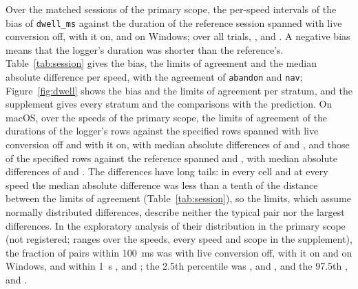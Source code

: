 Over the matched sessions of the primary scope, the per-speed intervals of the bias of \texttt{dwell\_ms} against the
duration of the reference session spanned  with live conversion
off,  with it on, and 
on Windows; over all trials, ,
 and . A negative bias means
that the logger's duration was shorter than the reference's. Table~\ref{tab:session} gives the bias, the limits of
agreement and the median absolute difference per speed, with the agreement of \texttt{abandon} and \texttt{nav};
Figure~\ref{fig:dwell} shows the bias and the limits of agreement per stratum, and the supplement gives every stratum
and the comparisons with the prediction. On macOS, over the speeds of the primary scope, the limits of agreement of the
durations of the logger's rows against the specified rows spanned
 with live conversion off and
 with it on, with median absolute differences of
 and
, and those of the specified rows against the reference
spanned  and
, with median absolute differences of
 and
. The differences have long tails: in every cell and at every
speed the median absolute difference was less than a tenth of the distance between the limits of agreement
(Table~\ref{tab:session}), so the limits, which assume normally distributed differences, describe neither the typical
pair nor the largest differences. In the exploratory analysis of their distribution in the primary scope (not
registered; ranges over the speeds, every speed and scope in the supplement), the fraction of pairs within 100~ms was
 with live conversion off,
 with it on and  on
Windows, and within 1~s ,
 and ; the 2.5th
percentile was ,  and
, and the 97.5th ,
 and .

